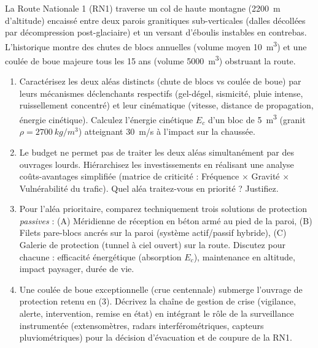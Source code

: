 \documentclass[11pt]{article}
\begin{document}
\begin{exercice}
La Route Nationale 1 (RN1) traverse un col de haute montagne (\SI{2200}{m} d'altitude) encaissé entre deux parois granitiques sub-verticales (dalles décollées par décompression post-glaciaire) et un versant d'éboulis instables en contrebas. L'historique montre des chutes de blocs annuelles (volume moyen \SI{10}{m^3}) et une coulée de boue majeure tous les 15 ans (volume \SI{5000}{m^3}) obstruant la route.

\begin{enumerate}
    \item Caractérisez les deux aléas distincts (chute de blocs vs coulée de boue) par leurs mécanismes déclenchants respectifs (gel-dégel, sismicité, pluie intense, ruissellement concentré) et leur cinématique (vitesse, distance de propagation, énergie cinétique). Calculez l'énergie cinétique $E_c$ d'un bloc de \SI{5}{m^3} (granit $\rho = \SI{2700}{kg/m^3}$) atteignant \SI{30}{m/s} à l'impact sur la chaussée.
    \item Le budget ne permet pas de traiter les deux aléas simultanément par des ouvrages lourds. Hiérarchisez les investissements en réalisant une analyse coûts-avantages simplifiée (matrice de criticité : Fréquence $\times$ Gravité $\times$ Vulnérabilité du trafic). Quel aléa traitez-vous en priorité ? Justifiez.
    \item Pour l'aléa prioritaire, comparez techniquement trois solutions de protection \textit{passives} : (A) Méridienne de réception en béton armé au pied de la paroi, (B) Filets pare-blocs ancrés sur la paroi (système actif/passif hybride), (C) Galerie de protection (tunnel à ciel ouvert) sur la route. Discutez pour chacune : efficacité énergétique (absorption $E_c$), maintenance en altitude, impact paysager, durée de vie.
    \item Une coulée de boue exceptionnelle (crue centennale) submerge l'ouvrage de protection retenu en (3). Décrivez la chaîne de gestion de crise (vigilance, alerte, intervention, remise en état) en intégrant le rôle de la surveillance instrumentée (extensomètres, radars interférométriques, capteurs pluviométriques) pour la décision d'évacuation et de coupure de la RN1.
\end{enumerate}
\end{exercice}
\end{document}
